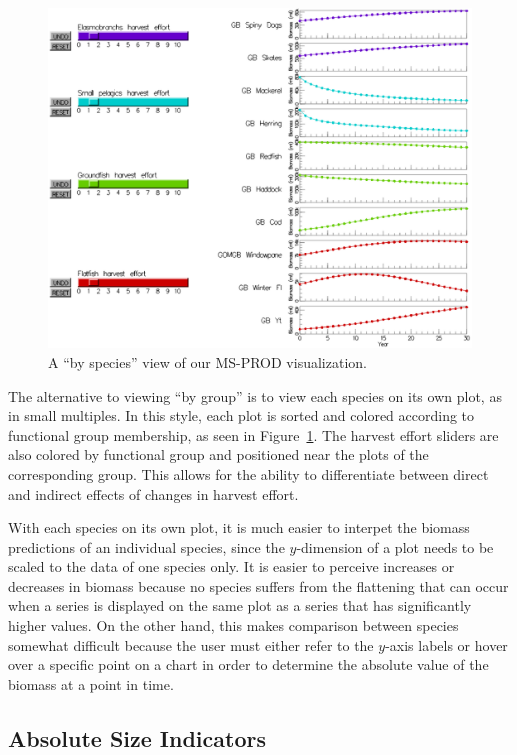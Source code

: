 \begin{figure}[h]
	\centering
	\includegraphics[width=13cm]{figures/eps/msprod_species.eps}
	\caption{A ``by species'' view of our MS-PROD visualization.}
	\label{fig:msprod_species}
\end{figure}

The alternative to viewing ``by group'' is to view each species on its own plot, as in small multiples.  In this style, each plot is sorted and colored according to functional group membership, as seen in Figure~\ref{fig:msprod_species}.  The harvest effort sliders are also colored by functional group and positioned near the plots of the corresponding group.  This allows for the ability to differentiate between direct and indirect effects of changes in harvest effort.

With each species on its own plot, it is much easier to interpet the biomass predictions of an individual species, since the $y$-dimension of a plot needs to be scaled to the data of one species only.  It is easier to perceive increases or decreases in biomass because no species suffers from the flattening that can occur when a series is displayed on the same plot as a series that has significantly higher values.  On the other hand, this makes comparison between species somewhat difficult because the user must either refer to the $y$-axis labels or hover over a specific point on a chart in order to determine the absolute value of the biomass at a point in time.

\subsection{Absolute Size Indicators}

